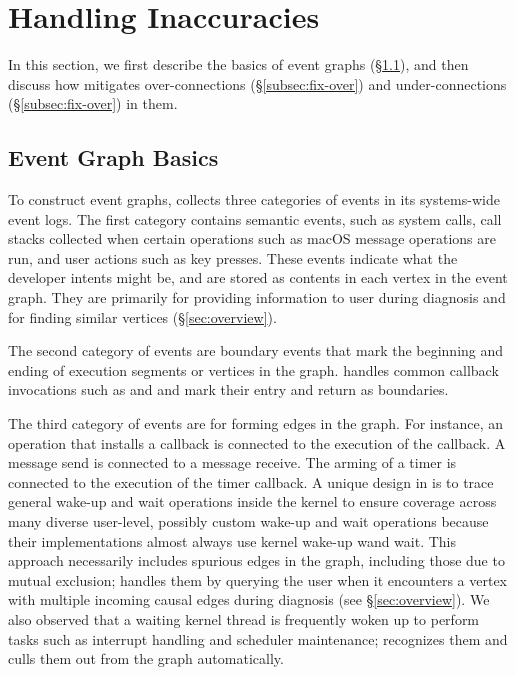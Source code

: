 \section{Handling Inaccuracies}\label{sec:graphcomputing}

In this section, we first describe the basics of \xxx event graphs
(\S\ref{subsec:eventgraph}), and then discuss how \xxx mitigates
over-connections (\S\ref{subsec:fix-over}) and under-connections
(\S\ref{subsec:fix-over}) in them.

\subsection{Event Graph Basics}\label{subsec:eventgraph}

To construct event graphs, \xxx collects three categories of events in its
systems-wide event logs.  The first category contains semantic events,
such as system calls, call stacks collected when certain operations such
as macOS message operations are run, and user actions such as key presses.
These events indicate what the developer intents might be, and are stored
as contents in each vertex in the event graph.  They are primarily for
providing information to user during diagnosis and for finding similar
vertices (\S\ref{sec:overview}).

The second category of events are boundary events that mark the beginning
and ending of execution segments or vertices in the graph.  \xxx handles
common callback invocations such as  and
 and mark their entry and return as boundaries.

The third category of events are for forming edges in the graph.  For
instance, an operation that installs a callback is connected to the
execution of the callback.  A message send is connected to a message
receive.  The arming of a timer is connected to the execution of the timer
callback.  A unique design in \xxx is to trace general wake-up and wait
operations inside the kernel to ensure coverage across many diverse
user-level, possibly custom wake-up and wait operations because their
implementations almost always use kernel wake-up wand wait.  This approach
necessarily includes spurious edges in the graph, including those due to
mutual exclusion; \xxx handles them by querying the user when it
encounters a vertex with multiple incoming causal edges during diagnosis
(see \S\ref{sec:overview}).  We also observed that a waiting kernel thread
is frequently woken up to perform tasks such as interrupt handling and
scheduler maintenance; \xxx recognizes them and culls them out from the
graph automatically.

